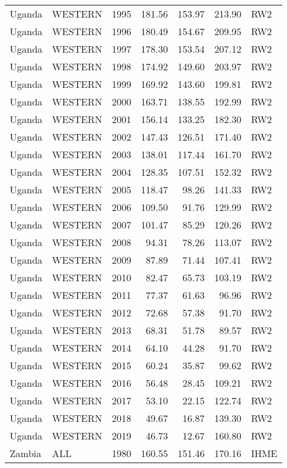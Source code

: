 \begin{longtable}{lllrrrl}
  Uganda & WESTERN & 1995 & 181.56 & 153.97 & 213.90 & RW2 \\ 
  Uganda & WESTERN & 1996 & 180.49 & 154.67 & 209.95 & RW2 \\ 
  Uganda & WESTERN & 1997 & 178.30 & 153.54 & 207.12 & RW2 \\ 
  Uganda & WESTERN & 1998 & 174.92 & 149.60 & 203.97 & RW2 \\ 
  Uganda & WESTERN & 1999 & 169.92 & 143.60 & 199.81 & RW2 \\ 
  Uganda & WESTERN & 2000 & 163.71 & 138.55 & 192.99 & RW2 \\ 
  Uganda & WESTERN & 2001 & 156.14 & 133.25 & 182.30 & RW2 \\ 
  Uganda & WESTERN & 2002 & 147.43 & 126.51 & 171.40 & RW2 \\ 
  Uganda & WESTERN & 2003 & 138.01 & 117.44 & 161.70 & RW2 \\ 
  Uganda & WESTERN & 2004 & 128.35 & 107.51 & 152.32 & RW2 \\ 
  Uganda & WESTERN & 2005 & 118.47 & 98.26 & 141.33 & RW2 \\ 
  Uganda & WESTERN & 2006 & 109.50 & 91.76 & 129.99 & RW2 \\ 
  Uganda & WESTERN & 2007 & 101.47 & 85.29 & 120.26 & RW2 \\ 
  Uganda & WESTERN & 2008 & 94.31 & 78.26 & 113.07 & RW2 \\ 
  Uganda & WESTERN & 2009 & 87.89 & 71.44 & 107.41 & RW2 \\ 
  Uganda & WESTERN & 2010 & 82.47 & 65.73 & 103.19 & RW2 \\ 
  Uganda & WESTERN & 2011 & 77.37 & 61.63 & 96.96 & RW2 \\ 
  Uganda & WESTERN & 2012 & 72.68 & 57.38 & 91.70 & RW2 \\ 
  Uganda & WESTERN & 2013 & 68.31 & 51.78 & 89.57 & RW2 \\ 
  Uganda & WESTERN & 2014 & 64.10 & 44.28 & 91.70 & RW2 \\ 
  Uganda & WESTERN & 2015 & 60.24 & 35.87 & 99.62 & RW2 \\ 
  Uganda & WESTERN & 2016 & 56.48 & 28.45 & 109.21 & RW2 \\ 
  Uganda & WESTERN & 2017 & 53.10 & 22.15 & 122.74 & RW2 \\ 
  Uganda & WESTERN & 2018 & 49.67 & 16.87 & 139.30 & RW2 \\ 
  Uganda & WESTERN & 2019 & 46.73 & 12.67 & 160.80 & RW2 \\ 
  Zambia & ALL & 1980 & 160.55 & 151.46 & 170.16 & IHME \\ 

\end{longtable}
